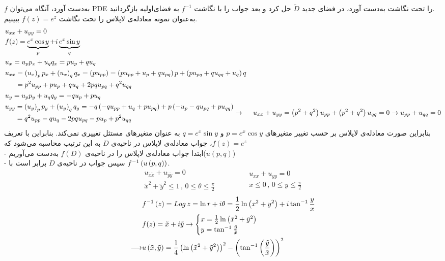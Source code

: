 $f$
به‌دست آورد، آنگاه می‌توان
PDE
را تحت نگاشت به‌دست آورد، در فضای جدید
$\tilde{D}$
حل کرد و بعد جواب را با نگاشت
$f^{-1}$
به فضای‌اولیه بازگردانید.\\
به‌عنوان نمونه معادله‌ی لاپلاس را تحت نگاشت
$f(z)=e^z$
ببینیم.
\[\begin{aligned}
	&
	u_{xx}+u_{yy}=0
	\\ &
	f(z)=\underbrace{e^x\cos y}_{p}+i \underbrace{e^x\sin y}_{q}
	\\ &
	u_x=u_pp_x+u_qq_x=pu_p+qu_q
	\\ &
	\begin{aligned}
		u_{xx} &= \left(u_x\right)_pp_x+\left(u_x\right)_qq_x=\left(pu_{pp}\right)=\left(pu_{pp}+u_p+qu_{pq}\right)p+\left(pu_{pq}+qu_{qq}+u_{q}\right)q
		\\ &
		=p^2u_{pp}+pu_p+qu_q+2pqu_{pq}+q^2u_{qq}
	\end{aligned}
	\\ &
	u_y=u_pp_y+u_qq_y=-qu_p+pu_q
	\\ &\begin{aligned}
		u_{yy}&=\left(u_y\right)_pp_y+\left(u_y\right)_qq_y=-q\left(-qu_{pp}+u_q+pu_{pq}\right)+p\left(-u_p-qu_{pq}+pu_{qq}\right)
		\\ &=q^2u_{pp}-qu_q-2pqu_{pq}-pu_p+p^2u_{qq}
	\end{aligned}
\rightarrow &
u_{xx}+u_{yy}=\left(p^2+q^2\right)u_{pp}+\left(p^2+q^2\right)u_{qq}=0\rightarrow u_{pp}+u_{qq}=0
\end{aligned}\]
بنابراین صورت معادله‌ی لاپلاس بر حسب تغییر متغیر‌های
$p=e^x\cos y$
و
$q=e^x\sin y$
به عنوان متغیر‌های مستثل تغییری نمی‌کند. بنابراین با تعریف
$f(z)=e^z$،
جواب معادله‌ی لاپلاس در ناحیه‌ی
$D$
به این ترتیب محاسبه می‌شود که\\
- ابتدا جواب معادله‌ی لاپلاس را در ناحیه‌ی
$f(D)$
به‌دست می‌آوریم($u(p,q)$)\\
- سپس جواب در ناحیه‌ی
$D$
برابر است با
$f^{-1}\left(u\left(p,q\right)\right)$.
\[
\begin{matrix}
	u_{\tilde x\tilde x}+u_{\tilde y\tilde y}=0\\
	{\tilde x}^2+{\tilde y}^2\le1 \, , \, 0\le \theta \le \frac\pi2
\end{matrix}\qquad\qquad\begin{matrix}
u_{xx}+u_{yy}=0\\
x\le0 \, , \, 0\le y\le \frac\pi2
\end{matrix}
\]
\[\begin{aligned}
&f^{-1}\left(z\right)=Log\, z=\ln r+i\theta=\frac12\ln\left(x^2+y^2\right)+i\tan^{-1}\frac yx
\\ &
f(z)=\tilde x+i\tilde y\rightarrow\begin{cases}
	x=\frac12\ln\left({\tilde x}^2+{\tilde y}^2\right)\\
	y=\tan^{-1}\frac{\tilde y}{\tilde x}
\end{cases}
\\ \longrightarrow &
u\left(\tilde x,\tilde y\right)=\frac14\left(\ln\left({\tilde x}^2+{\tilde y}^2\right)\right)^2-\left(\tan^{-1}\left(\frac{\tilde y}{\tilde x}\right)\right)^2
\end{aligned}\]